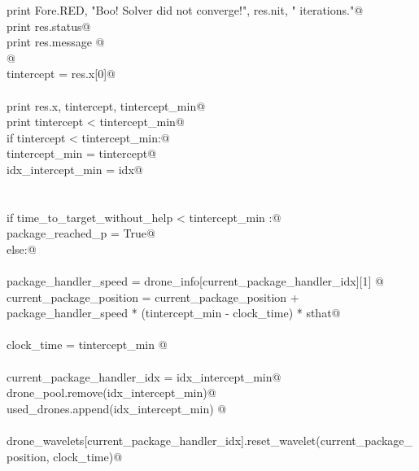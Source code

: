 \documentclass[12.0pt]{report}
\begin{document}
\begin{flushleft}
\begin{list}{}{}
\mbox{}\verb@                      print Fore.RED, "Boo! Solver did not converge!", res.nit, " iterations."@\\
\mbox{}\verb@                      print res.status@\\
\mbox{}\verb@                      print res.message @\\
\mbox{}\verb@                @\\
\mbox{}\verb@                tintercept = res.x[0]@\\
\mbox{}\verb@@\\
\mbox{}\verb@                print res.x, tintercept, tintercept_min@\\
\mbox{}\verb@                print tintercept < tintercept_min@\\
\mbox{}\verb@                if tintercept < tintercept_min:@\\
\mbox{}\verb@                   tintercept_min    = tintercept@\\
\mbox{}\verb@                   idx_intercept_min = idx@\\
\mbox{}\verb@@\\
\mbox{}\verb@@\\
\mbox{}\verb@          if time_to_target_without_help < tintercept_min :@\\
\mbox{}\verb@              package_reached_p = True@\\
\mbox{}\verb@          else:@\\
\mbox{}\verb@@\\
\mbox{}\verb@              package_handler_speed     = drone_info[current_package_handler_idx][1] @\\
\mbox{}\verb@              current_package_position  = current_package_position + \@\\
\mbox{}\verb@                   package_handler_speed * (tintercept_min - clock_time) *  sthat@\\
\mbox{}\verb@@\\
\mbox{}\verb@              clock_time = tintercept_min @\\
\mbox{}\verb@@\\
\mbox{}\verb@              current_package_handler_idx = idx_intercept_min@\\
\mbox{}\verb@              drone_pool.remove(idx_intercept_min)@\\
\mbox{}\verb@              used_drones.append(idx_intercept_min)  @\\
\mbox{}\verb@@\\
\mbox{}\verb@              drone_wavelets[current_package_handler_idx].reset_wavelet(current_package_position, clock_time)@\\

\end{list}
\end{flushleft}
\end{document}
